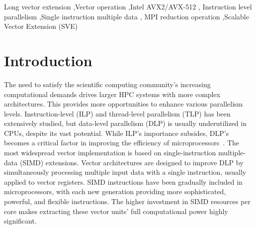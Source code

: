 \documentclass[5p,times,twocolumn]{elsarticle}
\begin{document}
\begin{abstract}
%
\end{abstract}

\begin{keyword}
Long vector extension \sep Vector operation \sep Intel AVX2/AVX-512 \sep
Instruction level parallelism \sep Single instruction multiple data \sep
MPI reduction operation \sep Scalable Vector Extension (SVE)
\end{keyword}

\maketitle

\section{Introduction}\label{sec:intro}
The need to satisfy the scientific computing community's increasing
computational demands drives larger HPC systems with more complex architectures. This provides more opportunities to enhance various parallelism levels.
%
Instruction-level (ILP) and thread-level parallelism (TLP) has been extensively
studied, but data-level parallelism (DLP) is usually underutilized in CPUs, despite its vast potential.
While ILP's importance subsides, DLP's becomes a critical
factor in improving the efficiency of
microprocessors~\cite{energyeffects, HardwareEvents, espasa1998vector, Watson1972TheTA, clusterefficiency}.
The most widespread vector implementation is based on single-instruction multiple-data (SIMD) extensions.
Vector architectures are designed to improve DLP by simultaneously processing multiple input data with a single instruction, usually applied to vector registers.
SIMD instructions have been gradually included in
microprocessors, with each new generation providing more sophisticated, powerful, and flexible
instructions. The higher investment in SIMD resources per core makes extracting
these vector units' full computational power highly significant.
\end{document}
